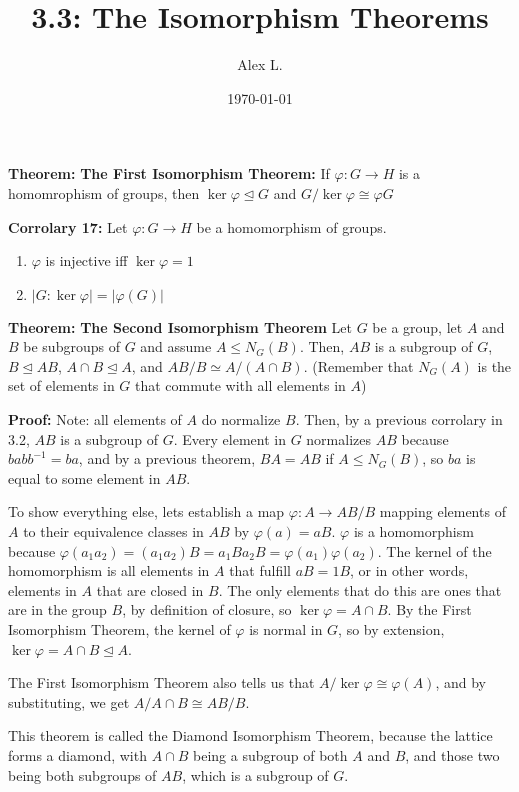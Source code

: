 \documentclass{article}
\title{3.3: The Isomorphism Theorems}
\author{Alex L.}
\date{\today}
\begin{document}
\maketitle

\textbf{Theorem:} \textbf{The First Isomorphism Theorem:} If $\varphi : G \rightarrow H$ is a homomrophism of groups, then $\ker \varphi \trianglelefteq G$ and $G/ \ker \varphi  \cong \varphi G$

\textbf{Corrolary 17:} Let $\varphi : G \rightarrow H$ be a homomorphism of groups.
\begin{enumerate}
    \item $\varphi $ is injective iff $\ker \varphi = 1$
    \item $\vert G : \ker \varphi \vert = \vert \varphi (G) \vert$
\end{enumerate}  

\textbf{Theorem:} \textbf{The Second Isomorphism Theorem} Let $G$ be a group, let $A$ and $B$ be subgroups of $G$ and assume $A \leq N_G(B)$. Then, $AB$ is a subgroup of $G$, $B \trianglelefteq AB$, $A \cap B \trianglelefteq A$, and $AB/B \simeq A/(A\cap B)$. (Remember that $N_G(A)$ is the set of elements in $G$ that commute with all elements in $A$)

\textbf{Proof:} Note: all elements of $A$ do normalize $B$. Then, by a previous corrolary in 3.2, $AB$ is a subgroup of $G$. Every element in $G$ normalizes $AB$ because $b ab b ^{-1}  = ba$, and by a previous theorem, $BA = AB$ if $A \leq N_G(B)$, so $ba$ is equal to some element in $AB$. 

To show everything else, lets establish a map $\varphi: A \rightarrow AB/B$ mapping elements of $A$ to their equivalence classes in $AB$ by $\varphi (a) = aB$. $\varphi$ is a homomorphism because $\varphi (a_1 a_2) = (a_1 a_2)B = a_1 B a_2 B = \varphi (a_1) \varphi (a_2)$. The kernel of the homomorphism is all elements in $A$ that fulfill $aB = 1B$, or in other words, elements in $A$ that are closed in $B$. The only elements that do this are ones that are in the group $B$, by definition of closure, so $\ker \varphi  = A \cap B$. By the First Isomorphism Theorem, the kernel of $\varphi$ is normal in $G$, so by extension, $\ker \varphi = A\cap B  \trianglelefteq A$. 

The First Isomorphism Theorem also tells us that $A/\ker \varphi \cong \varphi (A)$, and by substituting, we get $A/A \cap B \cong AB/B$.

This theorem is called the Diamond Isomorphism Theorem, because the lattice forms a diamond, with $A \cap B$ being a subgroup of both $A$ and $B$, and those two being both subgroups of $AB$, which is a subgroup of $G$. 
\end{document}
